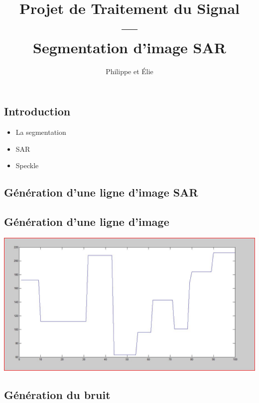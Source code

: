 \documentclass{beamer}
\title{Projet de Traitement du Signal\\---\\Segmentation d'image SAR}
\author{Philippe \bsc{Tran Ba} et Élie \bsc{Bouttier}}
\institute{ENSEEIHT, département TR}
\newcommand{\FSource}[1]{%
  
  }
\begin{document}
\begin{frame}
\titlepage
\end{frame}

\begin{frame}
\tableofcontents
\end{frame}

\begin{frame}
\section{Introduction}
\begin{itemize}
 \item La segmentation
 \item SAR
 \item Speckle
\end{itemize}
\end{frame}

\begin{frame}
\section{Génération d'une ligne d'image SAR}
\subsection{Génération d'une ligne d'image}
\FSource{matlab/1.m}
\end{frame}

\begin{frame}
\begin{center}
\includegraphics[scale=0.35]{capture/Capturer.JPG}
\end{center}
\end{frame}

\begin{frame}
\subsection{Génération du bruit}
\FSource{matlab/A.m}
\end{frame}
\end{document}
